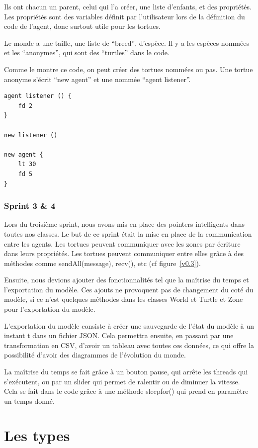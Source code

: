 Ils ont chacun un parent, celui qui l'a créer, une liste d'enfants, et des propriétés. Les propriétés sont des variables définit par l'utilisateur lors de la définition du code de l'agent, donc surtout utile pour les tortues.


Le monde a une taille, une liste de \enquote{breed}, d'espèce. Il y a les espèces nommées et les \enquote{anonymes}, qui sont des \enquote{turtles} dans le code.


Comme le montre ce code, on peut créer des tortues nommées ou pas. Une tortue anonyme s'écrit \enquote{new agent} et une nommée \enquote{agent listener}.\\


\begin{lstlisting}
agent listener () {
	fd 2
}

new listener ()

new agent {
	lt 30
	fd 5
}
\end{lstlisting}
\subsubsection{Sprint 3 \& 4}
Lors du troisième sprint, nous avons mis en place des pointers intelligents dans toutes nos classes. Le but de ce sprint était la mise en place de la communication entre les agents. Les tortues peuvent communiquer avec les zones par écriture dans leurs propriétés. Les tortues peuvent communiquer entre elles grâce à des méthodes comme sendAll(message), recv(), etc 
(cf figure~\ref{v0.3}).

Ensuite, nous devions ajouter des fonctionnalités tel que la maîtrise du temps et l'exportation du modèle. Ces ajouts ne provoquent pas de changement du coté du modèle, si ce n'est quelques méthodes dans les classes World et Turtle et Zone pour l'exportation du modèle.

L'exportation du modèle consiste à créer une sauvegarde de l'état du modèle à un instant t dans un fichier JSON.
Cela permettra ensuite, en passant par une transformation en CSV, d'avoir un tableau avec toutes ces données, ce qui offre la possibilité d'avoir des diagrammes de l'évolution du monde.

La maîtrise du temps se fait grâce à un bouton pause, qui arrête les threads qui s'exécutent, ou par un slider qui permet de ralentir ou de diminuer la vitesse. Cela se fait dans le code grâce à une méthode sleepfor() qui prend en paramètre un temps donné.


\section{Les types}
